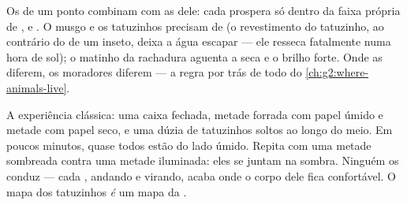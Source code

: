 \begin{proposition}\label{prop:g6:exploring-our-environment:decide}
Os  de um ponto combinam com as  dele: cada
 prospera só dentro da faixa própria de , 
e . O musgo e os tatuzinhos precisam de  (o revestimento
do tatuzinho, ao contrário do de um inseto, deixa a água escapar ---
ele resseca fatalmente numa hora de sol); o matinho da rachadura
aguenta a seca e o brilho forte. Onde as  diferem, os
moradores diferem --- a regra por trás de todo  do
\cref{ch:g2:where-animals-live}.
\end{proposition}
\admitted

\begin{example}\label{ex:g6:exploring-our-environment:chooser}
A experiência clássica: uma caixa fechada, metade forrada com papel
úmido e metade com papel seco, e uma dúzia de tatuzinhos soltos ao
longo do meio. Em poucos minutos, quase todos estão do lado úmido.
Repita com uma metade sombreada contra uma metade iluminada: eles se
juntam na sombra. Ninguém os conduz --- cada , andando e
virando, acaba onde o corpo dele fica confortável. O mapa dos
tatuzinhos \emph{é} um mapa da .
\end{example}

